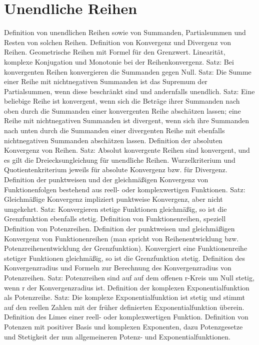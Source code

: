 \section{Unendliche Reihen}
 
Definition von unendlichen Reihen sowie von Summanden, Partialsummen und Resten von solchen Reihen. Definition von Konvergenz und Divergenz von Reihen. Geometrische Reihen mit Formel für den Grenzwert. Linearität, komplexe Konjugation und Monotonie bei der Reihenkonvergenz. Satz: Bei konvergenten Reihen konvergieren die Summanden gegen Null. Satz: Die Summe einer Reihe mit nichtnegativen Summanden ist das Supremum der Partialsummen, wenn diese beschränkt sind und andernfalls unendlich. Satz: Eine beliebige Reihe ist konvergent, wenn sich die Beträge ihrer Summanden nach oben durch die Summanden einer konvergenten Reihe abschätzen lassen; eine Reihe mit nichtnegativen Summanden ist divergent, wenn sich ihre Summanden nach unten durch die Summanden einer divergenten Reihe mit ebenfalls nichtnegativen Summanden abschätzen lassen. Definition der absoluten Konvergenz von Reihen. Satz: Absolut konvergente Reihen sind konvergent, und es gilt die Dreiecksungleichung für unendliche Reihen. Wurzelkriterium und Quotientenkriterium jeweils für absolute Konvergenz bzw. für Divergenz. Definition der punktweisen und der gleichmäßigen Konvergenz von Funktionenfolgen bestehend aus reell- oder komplexwertigen Funktionen. Satz: Gleichmäßige Konvergenz impliziert punktweise Konvergenz, aber nicht umgekehrt. Satz: Konvergieren stetige Funktionen gleichmäßig, so ist die Grenzfunktion ebenfalls stetig. Definition von Funktionenreihen, speziell Definition von Potenzreihen. Definition der punktweisen und gleichmäßigen Konvergenz von Funktionenreihen (man spricht von Reihenentwicklung bzw. Potenzreihenentwicklung der Grenzfunktion). Konvergiert eine Funktionenreihe stetiger Funktionen gleichmäßig, so ist die Grenzfunktion stetig. Definition des Konvergenzradius und Formeln zur Berechnung des Konvergenzradius von Potenzreihen. Satz: Potenzreihen sind auf auf dem offenen r-Kreis um Null stetig, wenn r der Konvergenzradius ist. Definition der komplexen Exponentialfunktion als Potenzreihe. Satz: Die komplexe Exponentialfunktion ist stetig und stimmt auf den reellen Zahlen mit der früher definierten Exponentialfunktion überein. Definition des Limes einer reell- oder komplexwertigen Funktion. Definition von Potenzen mit positiver Basis und komplexen Exponenten, dazu Potenzgesetze und Stetigkeit der nun allgemeineren Potenz- und Exponentialfunktionen. 



